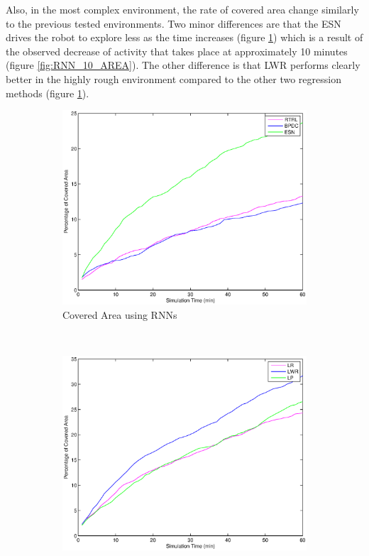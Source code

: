 \documentclass[msc,ai,logo]{infthesis}
\begin{document}
 Also, in the most complex environment, the rate of covered area change similarly to the previous tested environments. Two minor differences are that the ESN drives the robot to explore less as the time increases (figure \ref{fig:RNN_15_AREA}) which is a result of the observed decrease of activity that takes place at approximately 10 minutes (figure \ref{fig:RNN_10_AREA}). The other difference is that LWR performs clearly better in the highly rough environment compared to the other two regression methods (figure \ref{fig:RNN_15_AREA}).
\begin{figure}[H]
        \centering
        \begin{subfigure}[b]{0.49\textwidth}
                \centering
                \includegraphics[width=\textwidth]{RNN_15_AREA.eps}
                \caption{Covered Area using RNNs}
              \label{fig:RNN_15_AREA}  
        \end{subfigure}%
        ~ %
        \begin{subfigure}[b]{0.49\textwidth}
                \centering
                \includegraphics[width=\textwidth]{LR_15_AREA.eps}

\end{subfigure}
\end{figure}
\end{document}
